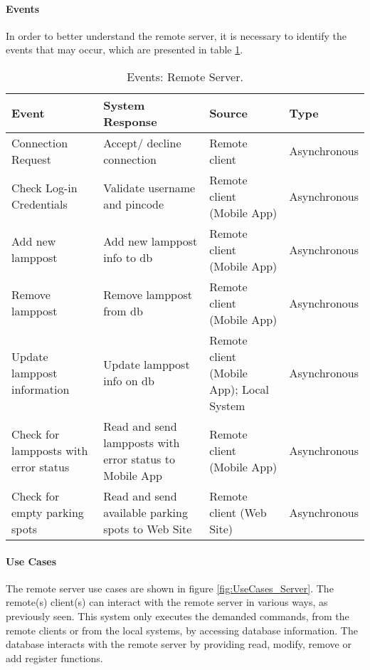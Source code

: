 \paragraph*{Events}
In order to better understand the remote server, it is necessary to identify the events that may occur, which are presented in table \ref{table:rs_events}.

\begin{table}[ht]
	\centering
	\resizebox{\columnwidth}{!}
	{
		\begin{tabular}{|m{3cm}|m{5cm}|m{2.4cm}|m{2.4cm}|}
			\hline
			\textbf{Event} & \textbf{System Response} & \textbf{Source} & \textbf{Type}\\
			\hline\hline
	
			Connection Request & Accept/ decline connection & Remote client & Asynchronous\\\hline
			
			Check Log-in Credentials & Validate username and pincode & Remote client (Mobile App) & Asynchronous\\\hline
			
			Add new lamppost & Add new lamppost info to \ac{db} & Remote client (Mobile App) & Asynchronous\\\hline
			
			Remove lamppost & Remove lamppost from \ac{db} & Remote client (Mobile App) & Asynchronous\\\hline
			
			Update lamppost information & Update lamppost info on \ac{db} & Remote client (Mobile App); Local System & Asynchronous\\\hline
			
			Check for lampposts with error status & Read and send lampposts with error status to Mobile App & Remote client (Mobile App) &  Asynchronous\\\hline
			
			Check for empty parking spots & Read and send available parking spots to Web Site & Remote client (Web Site) & Asynchronous\\\hline
		\end{tabular}
	}
	\caption{Events: Remote Server.}
	\label{table:rs_events}
\end{table}

\clearpage
\paragraph*{Use Cases}
The remote server use cases are shown in figure \ref{fig:UseCases_Server}. The remote(s) client(s) can interact with the remote server in various ways, as previously seen. This system only executes the demanded commands, from the remote clients or from the local systems, by accessing database information. The database interacts with the remote server by providing read, modify, remove or add register functions.

